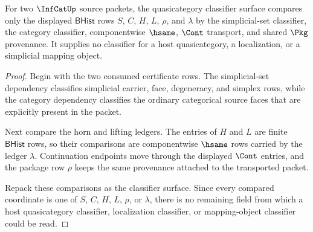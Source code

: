 \begin{theorem}
\label{thm:infcat-quasicategory-classifier-surface}
For two $\InfCatUp$ source packets, the quasicategory classifier surface
compares only the displayed $\mathsf{BHist}$ rows $S$, $C$, $H$, $L$,
$\rho$, and $\lambda$ by the simplicial-set classifier, the category
classifier, componentwise $\hsame$, $\Cont$ transport, and shared $\Pkg$
provenance. It supplies no classifier for a host quasicategory, a
localization, or a simplicial mapping object.
\end{theorem}
\begin{proof}
Begin with the two consumed certificate rows. The simplicial-set dependency
classifies simplicial carrier, face, degeneracy, and simplex rows, while the
category dependency classifies the ordinary categorical source faces that
are explicitly present in the packet.

Next compare the horn and lifting ledgers. The entries of $H$ and $L$ are
finite $\mathsf{BHist}$ rows, so their comparisons are componentwise
$\hsame$ rows carried by the ledger $\lambda$. Continuation endpoints move
through the displayed $\Cont$ entries, and the package row $\rho$ keeps the
same provenance attached to the transported packet.

Repack these comparisons as the classifier surface. Since every compared
coordinate is one of $S$, $C$, $H$, $L$, $\rho$, or $\lambda$, there is no
remaining field from which a host quasicategory classifier, localization
classifier, or mapping-object classifier could be read.
\end{proof}

